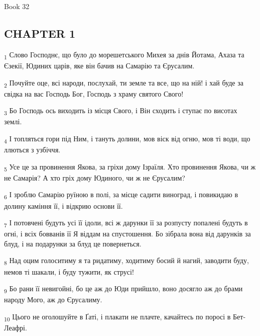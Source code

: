 Book 32
\subsection{CHAPTER 1}
\begin{tcolorbox}
\textsubscript{1} Слово Господнє, що було до морешетського Михея за днів Йотама, Ахаза та Єзекії, Юдиних царів, яке він бачив на Самарію та Єрусалим.
\end{tcolorbox}
\begin{tcolorbox}
\textsubscript{2} Почуйте оце, всі народи, послухай, ти земле та все, що на ній! і хай буде за свідка на вас Господь Бог, Господь з храму святого Свого!
\end{tcolorbox}
\begin{tcolorbox}
\textsubscript{3} Бо Господь ось виходить із місця Свого, і Він сходить і ступає по висотах землі.
\end{tcolorbox}
\begin{tcolorbox}
\textsubscript{4} І топляться гори під Ним, і тануть долини, мов віск від огню, мов ті води, що ллються з узбіччя.
\end{tcolorbox}
\begin{tcolorbox}
\textsubscript{5} Усе це за провинення Якова, за гріхи дому Ізраїля. Хто провинення Якова, чи ж не Самарія? А хто гріх дому Юдиного, чи ж не Єрусалим?
\end{tcolorbox}
\begin{tcolorbox}
\textsubscript{6} І зроблю Самарію руїною в полі, за місце садити виноград, і повикидаю в долину каміння її, і відкрию основи її.
\end{tcolorbox}
\begin{tcolorbox}
\textsubscript{7} І потовчені будуть усі її ідоли, всі ж дарунки її за розпусту попалені будуть в огні, і всіх бовванів її Я віддам на спустошення. Бо зібрала вона від дарунків за блуд, і на подарунки за блуд це повернеться.
\end{tcolorbox}
\begin{tcolorbox}
\textsubscript{8} Над оцим голоситиму я та ридатиму, ходитиму босий й нагий, заводити буду, немов ті шакали, і буду тужити, як струсі!
\end{tcolorbox}
\begin{tcolorbox}
\textsubscript{9} Бо рани її невигойні, бо це аж до Юди прийшло, воно досягло аж до брами народу Мого, аж до Єрусалиму.
\end{tcolorbox}
\begin{tcolorbox}
\textsubscript{10} Цього не оголошуйте в Ґаті, і плакати не плачте, качайтесь по поросі в Бет-Леафрі.
\end{tcolorbox}
